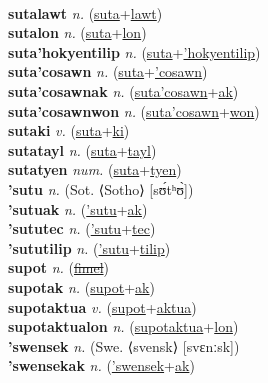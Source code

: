  \label{suta'aflikatecwon} \\
\textbf{sutalawt} \textit{n.} (\hyperref[suta]{suta}+\hyperref[lawt]{lawt})
 \label{sutalawt} \\
\textbf{sutalon} \textit{n.} (\hyperref[suta]{suta}+\hyperref[lon]{lon})
 \label{sutalon} \\
\textbf{suta'hokyentilip} \textit{n.} (\hyperref[suta]{suta}+\hyperref['hokyentilip]{'hokyentilip})
 \label{suta'hokyentilip} \\
\textbf{suta'cosawn} \textit{n.} (\hyperref[suta]{suta}+\hyperref['cosawn]{'cosawn})
 \label{suta'cosawn} \\
\textbf{suta'cosawnak} \textit{n.} (\hyperref[suta'cosawn]{suta'cosawn}+\hyperref[ak]{ak})
 \label{suta'cosawnak} \\
\textbf{suta'cosawnwon} \textit{n.} (\hyperref[suta'cosawn]{suta'cosawn}+\hyperref[won]{won})
 \label{suta'cosawnwon} \\
\textbf{sutaki} \textit{v.} (\hyperref[suta]{suta}+\hyperref[ki]{ki})
 \label{sutaki} \\
\textbf{sutatayl} \textit{n.} (\hyperref[suta]{suta}+\hyperref[tayl]{tayl})
 \label{sutatayl} \\
\textbf{sutatyen} \textit{num.} (\hyperref[suta]{suta}+\hyperref[tyen]{tyen})
 \label{sutatyen} \\
\textbf{'sutu} \textit{n.} (Sot. ⟨Sotho⟩ [sʊ́tʰʊ̀])
 \label{'sutu} \\
\textbf{'sutuak} \textit{n.} (\hyperref['sutu]{'sutu}+\hyperref[ak]{ak})
 \label{'sutuak} \\
\textbf{'sututec} \textit{n.} (\hyperref['sutu]{'sutu}+\hyperref[tec]{tec})
 \label{'sututec} \\
\textbf{'sututilip} \textit{n.} (\hyperref['sutu]{'sutu}+\hyperref[tilip]{tilip})
 \label{'sututilip} \\
\textbf{supot} \textit{n.} (\hyperref[fimel]{\sout{fimel}})
 \label{supot} \\
\textbf{supotak} \textit{n.} (\hyperref[supot]{supot}+\hyperref[ak]{ak})
 \label{supotak} \\
\textbf{supotaktua} \textit{v.} (\hyperref[supot]{supot}+\hyperref[aktua]{aktua})
 \label{supotaktua} \\
\textbf{supotaktualon} \textit{n.} (\hyperref[supotaktua]{supotaktua}+\hyperref[lon]{lon})
 \label{supotaktualon} \\
\textbf{'swensek} \textit{n.} (Swe. ⟨svensk⟩ [svɛnːsk])
 \label{'swensek} \\
\textbf{'swensekak} \textit{n.} (\hyperref['swensek]{'swensek}+\hyperref[ak]{ak})
